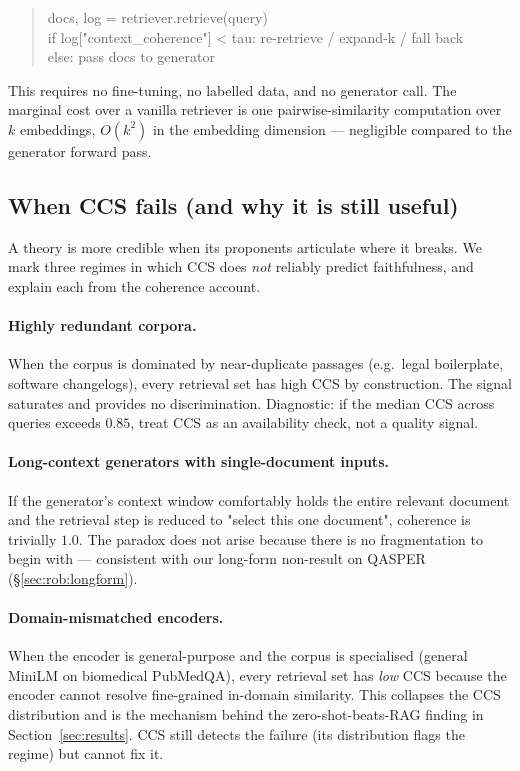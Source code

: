 \begin{quote}\small\ttfamily
docs, log = retriever.retrieve(query)\\
if log["context\_coherence"] < tau: re-retrieve / expand-k / fall back\\
else: pass docs to generator
\end{quote}

\noindent
This requires no fine-tuning, no labelled data, and no generator call.
The marginal cost over a vanilla retriever is one pairwise-similarity
computation over $k$ embeddings, $O(k^2)$ in the embedding dimension
--- negligible compared to the generator forward pass.

\subsection{When CCS fails (and why it is still useful)}
\label{sec:ccs_fails}

A theory is more credible when its proponents articulate where it
breaks. We mark three regimes in which CCS does \emph{not} reliably
predict faithfulness, and explain each from the coherence account.

\paragraph{Highly redundant corpora.}
When the corpus is dominated by near-duplicate passages (e.g.\ legal
boilerplate, software changelogs), every retrieval set has high CCS
by construction. The signal saturates and provides no discrimination.
Diagnostic: if the median CCS across queries exceeds $0.85$, treat
CCS as an availability check, not a quality signal.

\paragraph{Long-context generators with single-document inputs.}
If the generator's context window comfortably holds the entire
relevant document and the retrieval step is reduced to "select this
one document", coherence is trivially $1.0$. The paradox does not
arise because there is no fragmentation to begin with --- consistent
with our long-form non-result on QASPER (\S\ref{sec:rob:longform}).

\paragraph{Domain-mismatched encoders.}
When the encoder is general-purpose and the corpus is specialised
(general MiniLM on biomedical PubMedQA), every retrieval set has
\emph{low} CCS because the encoder cannot resolve fine-grained
in-domain similarity. This collapses the CCS distribution and is the
mechanism behind the zero-shot-beats-RAG finding in
Section~\ref{sec:results}. CCS still detects the failure (its
distribution flags the regime) but cannot fix it.

